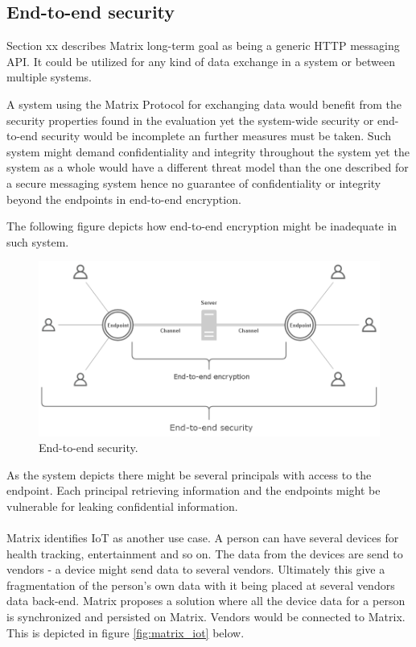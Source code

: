 \subsection{End-to-end security}

Section xx describes Matrix long-term goal as being a generic HTTP messaging API. It could be utilized for any kind of data exchange in a system or between multiple systems.

A system using the Matrix Protocol for exchanging data would benefit from the security properties found in the evaluation yet the system-wide security or end-to-end security would be incomplete an further measures must be taken. Such system might demand confidentiality and integrity throughout the system yet the system as a whole would have a different threat model than the one described for a secure messaging system hence no guarantee of confidentiality or integrity beyond the endpoints in end-to-end encryption. 

The following figure depicts how end-to-end encryption might be inadequate in such system. 

\begin{figure}[H]
	\centering
	\includegraphics[width=12cm]{figures/e2esecurity.png}
	\caption{End-to-end security.}
	\label{fig:e2esecurity}
\end{figure}


As the system depicts there might be several principals with access to the endpoint. Each principal  retrieving information and the endpoints might be vulnerable for leaking confidential information.   
\\
\\
Matrix identifies IoT as another use case. A person can have several devices for health tracking, entertainment and so on. The data from the devices are send to vendors - a device might send data to several vendors. Ultimately this give a fragmentation of the person's own data with it being placed at several vendors data back-end. Matrix proposes a solution where all the device data for a person is synchronized and persisted on Matrix. Vendors would be connected to Matrix. This is depicted in figure \ref{fig:matrix_iot} below. 

